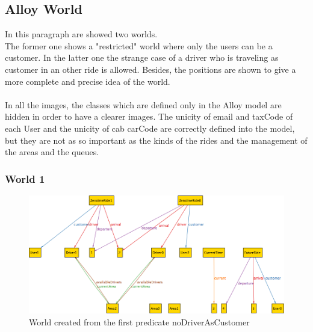 \clearpage

\subsection{Alloy World}
In this paragraph are showed two worlds.\\
The former one shows a "restricted" world where only the users can be a customer. In the latter one the strange case of a driver who is traveling as customer in an other ride is allowed. Besides, the positions are shown to give a more complete and precise idea of the world.\\
\\
In all the images, the classes which are defined only in the Alloy model are hidden in order to have a clearer images. The unicity of email and taxCode of each User and the unicity of cab carCode are correctly defined into the model, but they are not as so important as the kinds of the rides and the management of the areas and the queues.

\clearpage

\subsubsection{World 1}
\label{w1}
\begin{figure}[h!]
	\centerline{\includegraphics[scale=0.93, angle=90]{./figures/ALLOY_FirstPredicate.png}}
	\caption{World created from the first predicate noDriverAsCustomer}
	\label{w1fig}
\end{figure}

\clearpage

